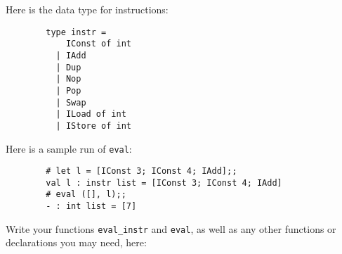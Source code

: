 \documentclass[11pt]{article}
\begin{document}
\begin{enumerate}
      \vspace{-2mm}

      Here is the data type for instructions:      

      \vspace{-2mm}

      \begin{Verbatim}
        type instr =
            IConst of int
          | IAdd
          | Dup
          | Nop
          | Pop
          | Swap
          | ILoad of int
          | IStore of int
      \end{Verbatim}

      \vspace{-2mm}

      Here is a sample run of \texttt{eval}:

      \vspace{-2mm}

      \begin{Verbatim}
        # let l = [IConst 3; IConst 4; IAdd];;
        val l : instr list = [IConst 3; IConst 4; IAdd]
        # eval ([], l);;
        - : int list = [7]
      \end{Verbatim}

      \vspace{-2mm}

      Write your functions \texttt{eval\_instr} and \texttt{eval}, as well
      as any other functions or declarations you may need, here:

    \end{enumerate}
\end{document}
